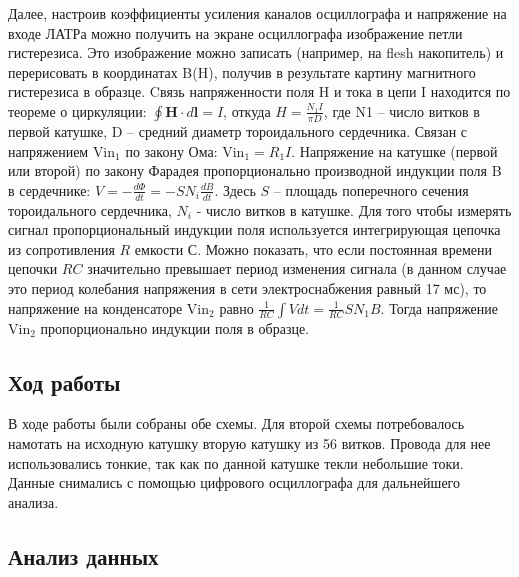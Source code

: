 \documentclass[a4paper,14pt]{extarticle}
\begin{document}
	Далее, настроив коэффициенты усиления каналов осциллографа и напряжение на входе ЛАТРа можно получить на экране осциллографа изображение петли гистерезиса. Это изображение можно записать (например, на flesh накопитель) и перерисовать в координатах B(H), получив в результате картину магнитного гистерезиса в образце. Cвязь напряженности поля H и тока в цепи I находится по теореме о циркуляции: $\oint\limits\mathbf{H}\cdot d\mathbf{l} = I$, откуда $H = \frac{N_1 I}{\pi D}$, где N1 – число витков в первой катушке, D – средний диаметр тороидального сердечника.
	Связан с напряжением $\text{Vin}_1$ по закону Ома: $\text{Vin}_1 = R_1 I$. Напряжение на катушке (первой или второй) по закону Фарадея пропорционально производной индукции поля B в сердечнике: $V = -\frac{d\Phi}{dt} = -SN_i\frac{dB}{dt}$. Здесь $S$ – площадь поперечного сечения тороидального сердечника, $N_i$ - число витков в катушке. Для того чтобы	измерять сигнал пропорциональный индукции поля используется интегрирующая цепочка из сопротивления $R$ емкости $С$. Можно показать, что если постоянная времени цепочки $RC$ значительно превышает период изменения сигнала (в данном случае это период колебания напряжения в сети электроснабжения равный 17 мс), то напряжение на конденсаторе $\text{Vin}_2$	равно $\frac{1}{RC}\int V dt = \frac{1}{RC}S N_1 B$. Тогда напряжение $\text{Vin}_2$ пропорционально индукции поля в образце.
	\subsection{Ход работы}
	В ходе работы были собраны обе схемы. Для второй схемы потребовалось намотать на исходную катушку вторую катушку из 56 витков. Провода для нее использовались тонкие, так как по данной катушке текли небольшие токи. Данные снимались с помощью цифрового осциллографа для дальнейшего анализа.
	\subsection{Анализ данных}
\end{document}
